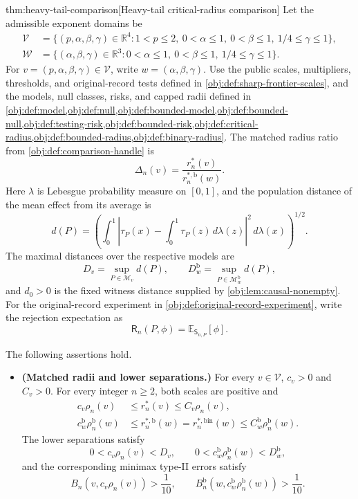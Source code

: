 \begin{theoremv}{thm:heavy-tail-comparison}[Heavy-tail critical-radius comparison]
Let the admissible exponent domains be
\[
\begin{aligned}
\mathcal V
&=\{(p,\alpha,\beta,\gamma)\in\mathbb R^4:
1<p\le2,\ 0<\alpha\le1,\ 0<\beta\le1,\ 1/4\le\gamma\le1\},\\
\mathcal W
&=\{(\alpha,\beta,\gamma)\in\mathbb R^3:
0<\alpha\le1,\ 0<\beta\le1,\ 1/4\le\gamma\le1\}.
\end{aligned}
\]
For \(v=(p,\alpha,\beta,\gamma)\in\mathcal V\), write
\(w=(\alpha,\beta,\gamma)\). Use the public scales, multipliers, thresholds, and original-record tests defined in \cref{obj:def:sharp-frontier-scales}, and the models, null classes, risks, and capped radii defined in \cref{obj:def:model,obj:def:null,obj:def:bounded-model,obj:def:bounded-null,obj:def:testing-risk,obj:def:bounded-risk,obj:def:critical-radius,obj:def:bounded-radius,obj:def:binary-radius}. The matched radius ratio from \cref{obj:def:comparison-handle} is
\[
\Delta_n(v)=\frac{r_n^*(v)}{r_n^{*,\mathrm b}(w)}.
\]
Here \(\lambda\) is Lebesgue probability measure on \([0,1]\), and the population distance of the mean effect from its average is
\[
d(P)=
\left(
\int_0^1
\left|\tau_P(x)-\int_0^1\tau_P(z)\,d\lambda(z)\right|^2
\,d\lambda(x)
\right)^{1/2}.
\]
The maximal distances over the respective models are
\[
D_v=\sup_{P\in\mathcal M_v}d(P),
\qquad
D_w^{\mathrm b}=\sup_{P\in\mathcal M^{\mathrm b}_w}d(P),
\]
and \(d_0>0\) is the fixed witness distance supplied by \cref{obj:lem:causal-nonempty}. For the original-record experiment in \cref{obj:def:original-record-experiment}, write the rejection expectation as
\[
\mathsf R_n(P,\phi)=\mathbb E_{\mathsf S_{n,P}}[\phi].
\]

The following assertions hold.
\begin{itemize}
\item \textbf{(Matched radii and lower separations.)}
For every \(v\in\mathcal V\), \(c_v>0\) and \(C_v>0\). For every integer \(n\ge2\), both scales are positive and
\[
\begin{aligned}
c_v\rho_n(v)
&\le r_n^*(v)\le C_v\rho_n(v),\\
c_w^{\mathrm b}\rho_n^{\mathrm b}(w)
&\le r_n^{*,\mathrm b}(w)
=r_n^{*,\mathrm{bin}}(w)
\le C_w^{\mathrm b}\rho_n^{\mathrm b}(w).
\end{aligned}
\]
The lower separations satisfy
\[
0<c_v\rho_n(v)<D_v,
\qquad
0<c_w^{\mathrm b}\rho_n^{\mathrm b}(w)<D_w^{\mathrm b},
\]
and the corresponding minimax type-II errors satisfy
\[
B_n\!\left(v,c_v\rho_n(v)\right)>\frac1{10},
\qquad
B_n^{\mathrm b}\!\left(w,c_w^{\mathrm b}\rho_n^{\mathrm b}(w)\right)>\frac1{10}.
\]


\end{itemize}
\end{theoremv}
